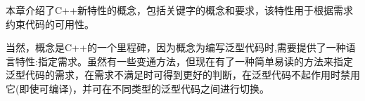 本章介绍了C++新特性的概念，包括关键字的概念和要求，该特性用于根据需求约束代码的可用性。

当然，概念是C++的一个里程碑，因为概念为编写泛型代码时,需要提供了一种语言特性:指定需求。虽然有一些变通方法，但现在有了一种简单易读的方法来指定泛型代码的需求，在需求不满足时可得到更好的判断，在泛型代码不起作用时禁用它(即使可编译)，并可在不同类型的泛型代码之间进行切换。